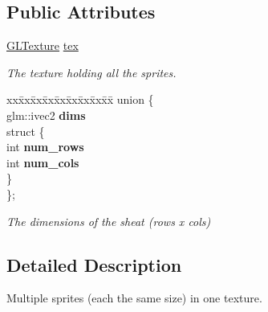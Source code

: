 \subsection*{Public Attributes}
\begin{DoxyCompactItemize}
\item 
\mbox{\label{structnta_1_1SpriteSheet_a6c55217abab2dbd76b61ad92fe902367}} 
\hyperlink{namespacenta_d3/dff/structnta_1_1GLTexture}{G\+L\+Texture} \hyperlink{structnta_1_1SpriteSheet_a6c55217abab2dbd76b61ad92fe902367}{tex}
\begin{DoxyCompactList}\small\item\em The texture holding all the sprites. \end{DoxyCompactList}\item 
\mbox{\label{structnta_1_1SpriteSheet_aad2a930c04420cdc26acbab618453d12}} 
\begin{tabbing}
xx\=xx\=xx\=xx\=xx\=xx\=xx\=xx\=xx\=\kill
union \{\\
\mbox{\label{structnta_1_1SpriteSheet_a9cd7233cd82a28a0acbdbbec805e8a76}} 
glm::ivec2 {\bfseries dims}\\
\mbox{\label{structnta_1_1SpriteSheet_a0c707cf7e684dcea61a99b749fc90758}} 
\>struct \{\\
\mbox{\label{structnta_1_1SpriteSheet_1_1_0D0_1_1_0D2_ac893c02f0affa345b63c86eb59f435b4}} 
int {\bfseries num\_rows}\\
\mbox{\label{structnta_1_1SpriteSheet_1_1_0D0_1_1_0D2_a8f1bbf0a4ad76a8d7162354d9c19b41b}} 
int {\bfseries num\_cols}\\
\>\} \\
\}; \\

\end{tabbing}\begin{DoxyCompactList}\small\item\em The dimensions of the sheat (rows x cols) \end{DoxyCompactList}\end{DoxyCompactItemize}


\subsection{Detailed Description}
Multiple sprites (each the same size) in one texture. 

